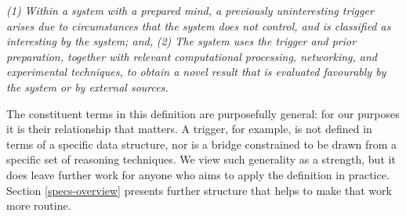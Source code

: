 
\begin{mdframed}
\begin{ndef}\label{def:serendipity}
\emph{(1) Within a system with a prepared mind, a previously uninteresting trigger arises due to circumstances that the system does not control, and is classified as interesting by the system; and,}
\emph{(2) The system uses the trigger and prior preparation, together with relevant computational processing, networking, and experimental techniques, to obtain a novel result that is evaluated favourably by the system or by external sources.}
\end{ndef}
\end{mdframed}

The constituent terms in this definition are purposefully general: for
our purposes it is their relationship that matters.  A trigger, for
example, is not defined in terms of a specific data structure, nor is
a bridge constrained to be drawn from a specific set of reasoning
techniques.  We view such generality as a strength, but it does leave
further work for anyone who aims to apply the definition in practice.
Section \ref{specs-overview} presents further structure that helps to
make that work more routine.


